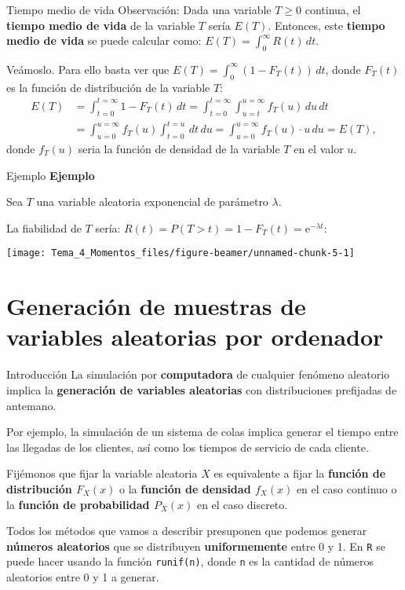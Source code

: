 \documentclass[
  ignorenonframetext,
  aspectratio=169]{beamer}
\begin{document}
\begin{frame}{Tiempo medio de vida}
\protect\hypertarget{tiempo-medio-de-vida}{}
Observación: Dada una variable \(T\geq 0\) continua, el \textbf{tiempo
medio de vida} de la variable \(T\) sería \(E(T)\). Entonces, este
\textbf{tiempo medio de vida} se puede calcular como:
\(E(T)=\int_0^\infty R(t)\, dt.\)

Veámoslo. Para ello basta ver que
\(E(T)=\int_0^\infty (1-F_T(t))\, dt\), donde \(F_T(t)\) es la función
de distribución de la variable \(T\): \[
\begin{array}{rl}
E(T) & =\int_{t=0}^{t=\infty} 1-F_T(t)\, dt=\int_{t=0}^{t=\infty}\int_{u=t}^{u=\infty} f_T(u)\,du\,dt \\ & =\int_{u=0}^{u=\infty} f_T(u)\int_{t=0}^{t=u} \, dt\, du =\int_{u=0}^{u=\infty} f_T(u)\cdot u\, du = E(T),
\end{array}
\] donde \(f_T(u)\) seria la función de densidad de la variable \(T\) en
el valor \(u\).
\end{frame}

\begin{frame}{Ejemplo}
\protect\hypertarget{ejemplo-3}{}
\textbf{Ejemplo}

Sea \(T\) una variable aleatoria exponencial de parámetro \(\lambda\).

La fiabilidad de \(T\) sería:
\(R(t)=P(T>t)=1-F_T(t)=\mathrm{e}^{-\lambda t}\):

\texttt{[image: Tema\_4\_Momentos\_files/figure-beamer/unnamed-chunk-5-1]}
\end{frame}

\hypertarget{generaciuxf3n-de-muestras-de-variables-aleatorias-por-ordenador}{%
\section{Generación de muestras de variables aleatorias por
ordenador}\label{generaciuxf3n-de-muestras-de-variables-aleatorias-por-ordenador}}

\begin{frame}[fragile]{Introducción}
\protect\hypertarget{introducciuxf3n-2}{}
La simulación por \textbf{computadora} de cualquier fenómeno aleatorio
implica la \textbf{generación de variables aleatorias} con
distribuciones prefijadas de antemano.

Por ejemplo, la simulación de un sistema de colas implica generar el
tiempo entre las llegadas de los clientes, así como los tiempos de
servicio de cada cliente.

Fijémonos que fijar la variable aleatoria \(X\) es equivalente a fijar
la \textbf{función de distribución \(F_X(x)\)} o la \textbf{función de
densidad \(f_X(x)\)} en el caso continuo o la \textbf{función de
probabilidad \(P_X(x)\)} en el caso discreto.

Todos los métodos que vamos a describir presuponen que podemos generar
\textbf{números aleatorios} que se distribuyen \textbf{uniformemente}
entre 0 y 1. En \texttt{R} se puede hacer usando la función
\texttt{runif(n)}, donde \texttt{n} es la cantidad de números aleatorios
entre 0 y 1 a generar.
\end{frame}
\end{document}
